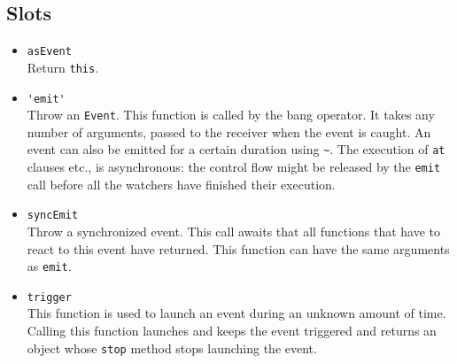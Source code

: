 \subsection{Slots}
\begin{itemize}
\item \lstinline|asEvent|\\
  Return \lstinline|this|.

\item \lstinline|'emit'|\\
  Throw an \lstinline|Event|. This function is called by the bang
  operator.  It takes any number of arguments, passed to the receiver
  when the event is caught. An event can also be emitted for a certain
  duration using \lstinline|~|.  The execution of \lstinline|at|
  clauses etc., is asynchronous: the control flow might be released by
  the \lstinline|emit| call before all the watchers have finished
  their execution.

\item \lstinline|syncEmit|\\
  Throw a synchronized event. This call awaits that all functions that
  have to react to this event have returned.  This function can have
  the same arguments as \lstinline|emit|.

\item \lstinline|trigger|\\
  This function is used to launch an event during an unknown amount of
  time. Calling this function launches and keeps the event triggered
  and returns an object whose \lstinline|stop| method stops launching
  the event.
\end{itemize}

